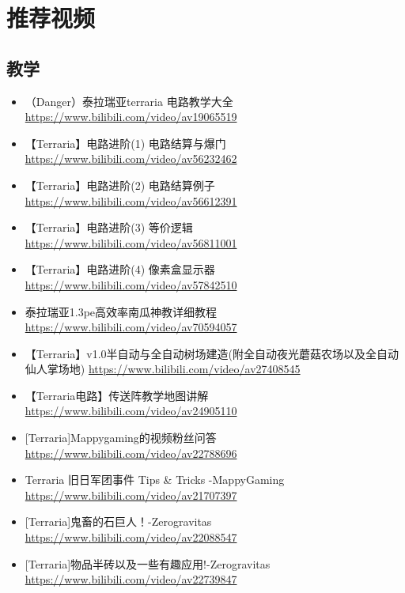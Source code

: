 \chapter{推荐视频}
\section{教学}
\begin{itemize}
\item （Danger）泰拉瑞亚terraria 电路教学大全 \url{https://www.bilibili.com/video/av19065519}
\item 【Terraria】电路进阶(1) 电路结算与爆门 \url{https://www.bilibili.com/video/av56232462}
\item 【Terraria】电路进阶(2) 电路结算例子 \url{https://www.bilibili.com/video/av56612391}
\item 【Terraria】电路进阶(3) 等价逻辑 \url{https://www.bilibili.com/video/av56811001}
\item 【Terraria】电路进阶(4) 像素盒显示器 \url{https://www.bilibili.com/video/av57842510}
\item 泰拉瑞亚1.3pe高效率南瓜神教详细教程 \url{https://www.bilibili.com/video/av70594057}
\item 【Terraria】v1.0半自动与全自动树场建造(附全自动夜光蘑菇农场以及全自动仙人掌场地) \url{https://www.bilibili.com/video/av27408545}
\item 【Terraria电路】传送阵教学地图讲解 \url{https://www.bilibili.com/video/av24905110}
\item {[}Terraria]Mappygaming的视频粉丝问答 \url{https://www.bilibili.com/video/av22788696}
\item Terraria 旧日军团事件 Tips & Tricks -MappyGaming \url{https://www.bilibili.com/video/av21707397}
\item {[}Terraria]鬼畜的石巨人！-Zerogravitas \url{https://www.bilibili.com/video/av22088547}
\item {[}Terraria]物品半砖以及一些有趣应用!-Zerogravitas \url{https://www.bilibili.com/video/av22739847}
\end{itemize}

